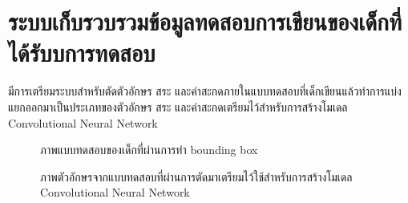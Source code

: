 \documentclass[12pt,oneside,openright,a4paper]{cpe-thai-project}
\begin{document}
\section{ ระบบเก็บรวบรวมข้อมูลทดสอบการเขียนของเด็กที่ได้รับบการทดสอบ}
มีการเตรียมระบบสำหรับตัดตัวอักษร สระ และคำสะกดภายในแบบทดสอบที่เด็กเขียนแล้วทำการแบ่งแยกออกมาเป็นประเภทของตัวอักษร สระ และคำสะกดเตรียมไว้สำหรับการสร้างโมเดล Convolutional Neural Network
\begin{figure}[!h]\centering
  \setlength{\fboxrule}{0.2mm} %
  \setlength{\fboxsep}{1cm}
  \caption{ภาพแบบทดสอบของเด็กที่ผ่านการทำ bounding box}\label{fig:system}                  
 \end{figure}
 \newpage
 \begin{figure}[!h]\centering
  \setlength{\fboxrule}{0.2mm} %
  \setlength{\fboxsep}{1cm}
  \caption{ภาพตัวอักษรจากแบบทดสอบที่ผ่านการตัดมาเตรียมไว้ใช้สำหรับการสร้างโมเดล Convolutional Neural Network}\label{fig:system}                  
 \end{figure}
\end{document}
